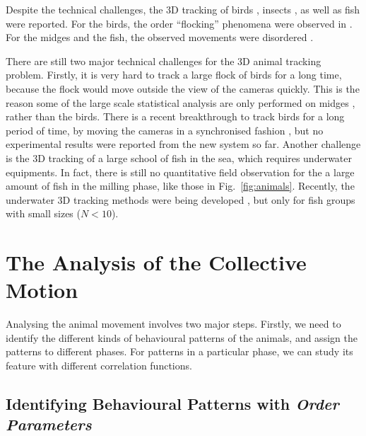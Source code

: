 \documentclass[11pt,twoside]{report}
\begin{document}
Despite the technical challenges, the 3D tracking of birds \cite{cavagna2008ab, nagy2010, attanasi2014np, ling2019nee}, insects \cite{butail2011, straw2011, attanasi2014prl, kelley2013, vandervaart2019}, as well as fish \cite{stowers2017, rosa2020, yang2021pcb} were reported.
For the birds, the order ``flocking'' phenomena were observed in \cite{ballerini2008pnas, cavagna2010, nagy2010, ling2018}. For the midges and the fish, the observed movements were disordered \cite{attanasi2014pcb, kelley2013, yang2021pcb}.

There are still two major technical challenges for the 3D animal tracking problem. Firstly, it is very hard to track a large flock of birds for a long time, because the flock would move outside the view of the cameras quickly. This is the reason some of the large scale statistical analysis are only performed on midges \cite{cavagna2017np}, rather than the birds.
There is a recent breakthrough to track birds for a long period of time, by moving the cameras in a synchronised fashion \cite{cavagna2021}, but no experimental results were reported from the new system so far.
Another challenge is the 3D tracking of a large school of fish in the sea, which requires underwater equipments. In fact, there is still no quantitative field observation for the a large amount of fish in the milling phase, like those in Fig.~\ref{fig:animals}. Recently, the underwater 3D tracking methods were being developed \cite{francisco2020me, engel2021}, but only for fish groups with small sizes ($N < 10$).


\section{The Analysis of the Collective Motion}
\label{section:intro-analysis}


Analysing the animal movement involves two major steps. 
Firstly, we need to identify the different kinds of behavioural patterns of the animals, and assign the patterns to different phases. For patterns in a particular phase, we can study its feature with different correlation functions.

\subsection{Identifying Behavioural Patterns with \emph{Order Parameters}}
\label{section:intro-order}
\end{document}
